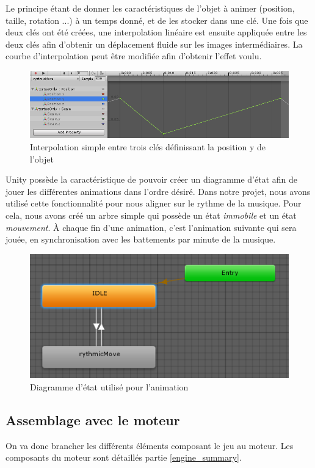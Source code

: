 Le principe étant de donner les caractéristiques de l'objet à animer (position, taille, rotation ...) à un temps donné, et de les stocker dans une clé. Une fois que deux clés ont été créées, une interpolation linéaire est ensuite appliquée entre les deux clés afin d'obtenir un déplacement fluide sur les images intermédiaires. La courbe d'interpolation peut être modifiée afin d'obtenir l'effet voulu.

\begin{figure}[H]\centering
  \includegraphics[scale=.55]{./img/technique_animation2.png}
  \caption{Interpolation simple entre trois clés définissant la position y de l'objet}
  \label{technique_animation2}
\end{figure}

Unity possède la caractéristique de pouvoir créer un diagramme d'état afin de jouer les différentes animations dans l'ordre désiré. Dans notre projet, nous avons utilisé cette fonctionnalité pour nous aligner sur le rythme de la musique. Pour cela, nous avons créé un arbre simple qui possède un état \textit{immobile} et un état \textit{mouvement}. À chaque fin d'une animation, c'est l'animation suivante qui sera jouée, en synchronisation avec les battements par minute de la musique.

\begin{figure}[H]\centering
  \includegraphics[scale=.55]{./img/technique_animation3.png}
  \caption{Diagramme d'état utilisé pour l'animation}
  \label{technique_animation3}
\end{figure}

\subsection{Assemblage avec le moteur}
On va donc brancher les différents éléments composant le jeu au moteur. Les composants du moteur sont détaillés partie \ref{engine_summary}. 
